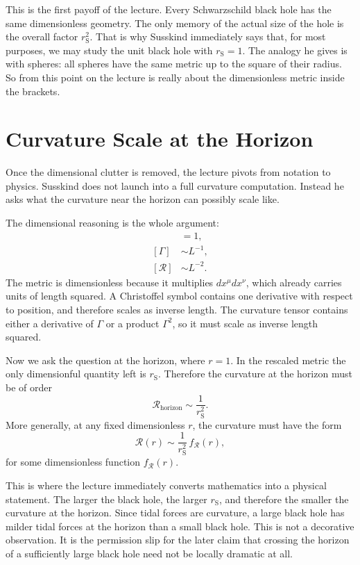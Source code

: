 This is the first payoff of the lecture. Every Schwarzschild black hole has the same dimensionless geometry. The only memory of the actual size of the hole is the overall factor \(r_{\mathrm S}^2\). That is why Susskind immediately says that, for most purposes, we may study the unit black hole with \(r_{\mathrm S}=1\). The analogy he gives is with spheres: all spheres have the same metric up to the square of their radius. So from this point on the lecture is really about the dimensionless metric inside the brackets.

\section{Curvature Scale at the Horizon}

Once the dimensional clutter is removed, the lecture pivots from notation to physics. Susskind does not launch into a full curvature computation. Instead he asks what the curvature near the horizon can possibly scale like.

The dimensional reasoning is the whole argument:
\begin{align}
[g_{\mu\nu}] &= 1,\\
[\Gamma] &\sim L^{-1},\\
[\mathcal R] &\sim L^{-2}.
\end{align}
The metric is dimensionless because it multiplies \(dx^\mu dx^\nu\), which already carries units of length squared. A Christoffel symbol contains one derivative with respect to position, and therefore scales as inverse length. The curvature tensor contains either a derivative of \(\Gamma\) or a product \(\Gamma^2\), so it must scale as inverse length squared.

Now we ask the question at the horizon, where \(r=1\). In the rescaled metric the only dimensionful quantity left is \(r_{\mathrm S}\). Therefore the curvature at the horizon must be of order
\begin{equation}
\mathcal R_{\text{horizon}} \sim \frac{1}{r_{\mathrm S}^2}.
\end{equation}
More generally, at any fixed dimensionless \(r\), the curvature must have the form
\begin{equation}
\mathcal R(r)\sim \frac{1}{r_{\mathrm S}^2}\,f_{\mathcal R}(r),
\end{equation}
for some dimensionless function \(f_{\mathcal R}(r)\).

This is where the lecture immediately converts mathematics into a physical statement. The larger the black hole, the larger \(r_{\mathrm S}\), and therefore the smaller the curvature at the horizon. Since tidal forces are curvature, a large black hole has milder tidal forces at the horizon than a small black hole. This is not a decorative observation. It is the permission slip for the later claim that crossing the horizon of a sufficiently large black hole need not be locally dramatic at all.

